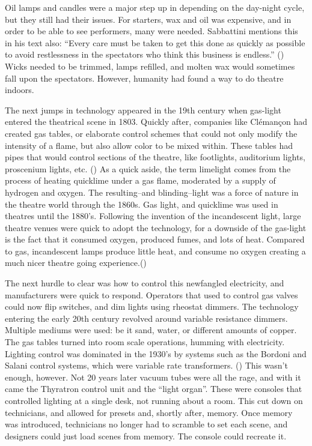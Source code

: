 \documentclass[12pt,twoside]{reedthesis}
\begin{document}
Oil lamps and candles were a major step up in depending on the day-night cycle, but they still had their issues. For starters, wax and oil was expensive, and in order to be able to see performers, many were needed. Sabbattini mentions this in his text also: “Every care must be taken to get this done as quickly as possible to avoid restlessness in the spectators who think this business is endless.” (\cite{internet_archive_renaissance_1958}) Wicks needed to be trimmed, lamps refilled, and molten wax would sometimes fall upon the spectators. However, humanity had found a way to do theatre indoors.

The next jumps in technology appeared in the 19th century when gas-light entered the theatrical scene in 1803. Quickly after, companies like Clémançon had created gas tables, or elaborate control schemes that could not only modify the intensity of a flame, but also allow color to be mixed within. These tables had pipes that would control sections of the theatre, like footlights, auditorium lights, proscenium lights, etc. (\cite{pilbrow_stage_1997}) As a quick aside, the term limelight comes from the process of heating quicklime under a gas flame, moderated by a supply of hydrogen and oxygen. The resulting–and blinding–light was a force of nature in the theatre world through the 1860s. Gas light, and quicklime was used in theatres until the 1880’s. Following the invention of the incandescent light, large theatre venues were quick to adopt the technology, for a downside of the gas-light is the fact that it consumed oxygen, produced fumes, and lots of heat. Compared to gas, incandescent lamps produce little heat, and consume no oxygen creating a much nicer theatre going experience.(\cite{wild_brief_2015})

The next hurdle to clear was how to control this newfangled electricity, and manufacturers were quick to respond. Operators that used to control gas valves could now flip switches, and dim lights using rheostat dimmers. The technology entering the early 20th century revolved around variable resistance dimmers. Multiple mediums were used: be it sand, water, or different amounts of copper. The gas tables turned into room scale operations, humming with electricity. Lighting control was dominated in the 1930’s by systems such as the Bordoni and Salani control systems, which were variable rate transformers. (\cite{keller_light_2006})
This wasn’t enough, however. Not 20 years later vacuum tubes were all the rage, and with it came the Thyratron control unit and the “light organ”. These were consoles that controlled lighting at a single desk, not running about a room. This cut down on technicians, and allowed for presets and, shortly after, memory. Once memory was introduced, technicians no longer had to scramble to set each scene, and designers could just load scenes from memory. The console could recreate it.
\end{document}
